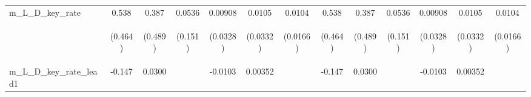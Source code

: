 \documentclass[]{article}
\begin{document}
\begin{center}
\begin{tabular}{lcccccccccccc}
m\_L\_D\_key\_rate & 0.538 & 0.387 & 0.0536 & 0.00908 & 0.0105 & 0.0104 & 0.538 & 0.387 & 0.0536 & 0.00908 & 0.0105 & 0.0104 \\
\vspace{4pt} & \begin{footnotesize}(0.464)\end{footnotesize} & \begin{footnotesize}(0.489)\end{footnotesize} & \begin{footnotesize}(0.151)\end{footnotesize} & \begin{footnotesize}(0.0328)\end{footnotesize} & \begin{footnotesize}(0.0332)\end{footnotesize} & \begin{footnotesize}(0.0166)\end{footnotesize} & \begin{footnotesize}(0.464)\end{footnotesize} & \begin{footnotesize}(0.489)\end{footnotesize} & \begin{footnotesize}(0.151)\end{footnotesize} & \begin{footnotesize}(0.0328)\end{footnotesize} & \begin{footnotesize}(0.0332)\end{footnotesize} & \begin{footnotesize}(0.0166)\end{footnotesize} \\
m\_L\_D\_key\_rate\_lead1 & -0.147 & 0.0300 &  & -0.0103 & 0.00352 &  & -0.147 & 0.0300 &  & -0.0103 & 0.00352 &  \\

\end{tabular}
\end{center}
\end{document}
